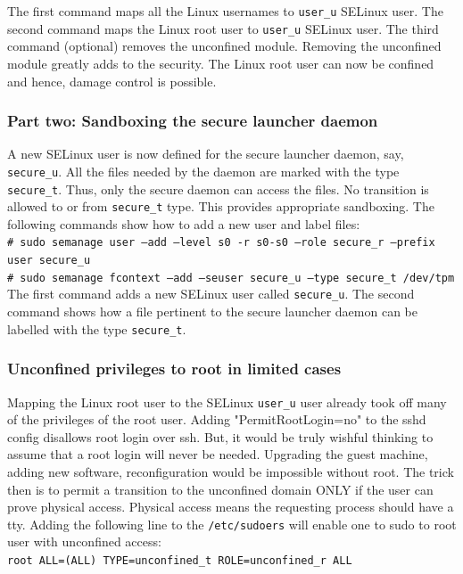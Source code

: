 \documentclass[10pt,twocolumn,pdftex]{article}
\begin{document}
The first command maps all the Linux usernames to {\tt user\_u} SELinux user. The second command maps the Linux root user to {\tt user\_u} SELinux user.  The third command (optional) removes the unconfined module. Removing the unconfined module greatly adds to the security. The Linux root user can now be confined and hence, damage control is possible.

\subsubsection{Part two: Sandboxing the secure launcher daemon}
A new SELinux user is now defined for the secure launcher daemon, say, {\tt secure\_u}. All the files needed by the daemon are marked with the type {\tt secure\_t}. Thus, only the secure daemon can access the files. No transition is allowed to or from {\tt secure\_t} type. This provides appropriate sandboxing. The following commands show how to add a new user and label files: \\
{\tt \# sudo semanage user --add --level s0 -r s0-s0 --role secure\_r --prefix user secure\_u}\\
{\tt \# sudo semanage fcontext --add --seuser secure\_u --type secure\_t /dev/tpm}\\

The first command adds a new SELinux user called {\tt secure\_u}. The second command shows how a file pertinent to the secure launcher daemon can be labelled with the type {\tt secure\_t}. 

\subsubsection{Unconfined privileges to root in limited cases}
Mapping the Linux root user to the SELinux {\tt user\_u} user already took off many of the privileges of the root user. Adding "PermitRootLogin=no" to the sshd config disallows root login over ssh. But, it would be truly wishful thinking to assume that a root login will never be needed. Upgrading the guest machine, adding new software, reconfiguration would be impossible without root. The trick then is to permit a transition to the unconfined domain ONLY if the user can prove physical access. Physical access means the requesting process should have a tty. Adding the following line to the {\tt /etc/sudoers} will enable one to sudo to root user with unconfined access: \\

{\tt root ALL=(ALL) TYPE=unconfined\_t ROLE=unconfined\_r ALL} \\
\end{document}
